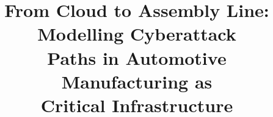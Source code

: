 \documentclass[conference]{IEEEtran}
\begin{document}
\title{From Cloud to Assembly Line: Modelling Cyberattack\\ Paths in Automotive Manufacturing as\\ Critical Infrastructure}

\author{\IEEEauthorblockN{\capmauthor}
}

\maketitle

\begin{abstract}
\capmabstract
\end{abstract}

\begin{IEEEkeywords}
\capmkeywords
\end{IEEEkeywords}





\end{document}
